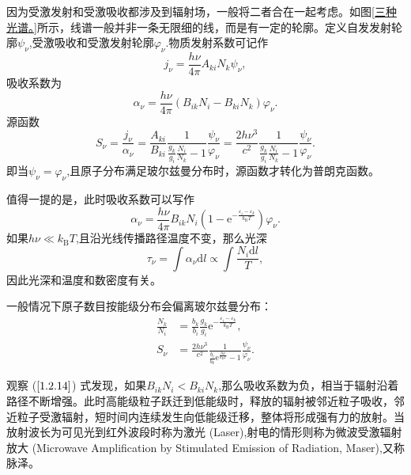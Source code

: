 \documentclass[../天体物理基础.tex]{subfiles}
\begin{document}
因为受激发射和受激吸收都涉及到辐射场，一般将二者合在一起考虑。如图\ref{三种光谱。}所示，线谱一般并非一条无限细的线，而是有一定的轮廓。定义自发发射轮廓$\psi_\nu$,受激吸收和受激发射轮廓$\varphi_\nu$.物质发射系数可记作
\begin{equation}
j_\nu=\frac{h\nu}{4\pi}A_{ki}N_k\psi_\nu,
\end{equation}
吸收系数为
\begin{equation}
\alpha_{\nu}=\frac{h\nu}{4\pi}(B_{ik}N_i-B_{ki}N_{k})\varphi_\nu.\label{1.2.14}
\end{equation}
源函数
\begin{equation}
S_\nu=\frac{j_\nu}{\alpha_\nu}=\frac{A_{ki}}{B_{ki}}\frac{1}{\frac{g_k}{g_i}\frac{N_i}{N_k}-1}\frac{\psi_\nu}{\varphi
_\nu}=\frac{2h\nu^3}{c^2}\frac{1}{\frac{g_k}{g_i}\frac{N_i}{N_k}-1}\frac{\psi_\nu}{\varphi
_\nu}.
\end{equation}
即当$\psi_\nu=\varphi_\nu$,且原子分布满足玻尔兹曼分布时，源函数才转化为普朗克函数。

值得一提的是，此时吸收系数可以写作
\begin{equation}
\alpha_{\nu}=\frac{h\nu}{4\pi}B_{ik}N_{i}\left(1-\mathrm{e}^{-\frac{\varepsilon_{i}-\varepsilon_{k}}{k_{\text{B}}T}}\right)\varphi_{\nu}.
\end{equation}
如果$h\nu\ll k_{\text{B}}T$,且沿光线传播路径温度不变，那么光深
\begin{equation}
\tau_{\nu}=\int\alpha_{\nu}\mathrm{d}l\propto{}\int\frac{N_{i}\mathrm{d}l}{T},
\end{equation}
因此光深和温度和数密度有关。

一般情况下原子数目按能级分布会偏离玻尔兹曼分布：
\begin{align}
\frac{N_k}{N_i}&=\frac{b_k}{b_i}\frac{g_k}{g_i}\mathrm{e}^{-\frac{\varepsilon_i-\varepsilon_k}{k_{\text{B}}T}},\\
S_\nu&=\frac{2h\nu^3}{c^2}\frac{1}{\frac{b_i}{b_k}\mathrm{e}^{\frac{h\nu}{k_{\text{B}}T}}-1}\frac{\psi_\nu}{\varphi_\nu}.
\end{align}

观察 ($\ref{1.2.14}$) 式发现，如果$B_{ik}N_{i}<B_{ki}N_{k}$,那么吸收系数为负，相当于辐射沿着路径不断增强。此时高能级粒子跃迁到低能级时，释放的辐射被邻近粒子吸收，邻近粒子受激辐射，短时间内连续发生向低能级迁移，整体将形成强有力的放射。当放射波长为可见光到红外波段时称为激光 (Laser),射电的情形则称为微波受激辐射放大 (Microwave Amplification by Stimulated Emission of Radiation, Maser),又称脉泽。
\end{document}
